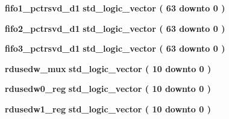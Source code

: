 \begin{DoxyCompactItemize}
\item 
{\bf fifo1\+\_\+pctrsvd\+\_\+d1} {\bfseries \textcolor{comment}{std\+\_\+logic\+\_\+vector}\textcolor{vhdlchar}{ }\textcolor{vhdlchar}{(}\textcolor{vhdlchar}{ }\textcolor{vhdlchar}{ } \textcolor{vhdldigit}{63} \textcolor{vhdlchar}{ }\textcolor{keywordflow}{downto}\textcolor{vhdlchar}{ }\textcolor{vhdlchar}{ } \textcolor{vhdldigit}{0} \textcolor{vhdlchar}{ }\textcolor{vhdlchar}{)}\textcolor{vhdlchar}{ }} 
\item 
{\bf fifo2\+\_\+pctrsvd\+\_\+d1} {\bfseries \textcolor{comment}{std\+\_\+logic\+\_\+vector}\textcolor{vhdlchar}{ }\textcolor{vhdlchar}{(}\textcolor{vhdlchar}{ }\textcolor{vhdlchar}{ } \textcolor{vhdldigit}{63} \textcolor{vhdlchar}{ }\textcolor{keywordflow}{downto}\textcolor{vhdlchar}{ }\textcolor{vhdlchar}{ } \textcolor{vhdldigit}{0} \textcolor{vhdlchar}{ }\textcolor{vhdlchar}{)}\textcolor{vhdlchar}{ }} 
\item 
{\bf fifo3\+\_\+pctrsvd\+\_\+d1} {\bfseries \textcolor{comment}{std\+\_\+logic\+\_\+vector}\textcolor{vhdlchar}{ }\textcolor{vhdlchar}{(}\textcolor{vhdlchar}{ }\textcolor{vhdlchar}{ } \textcolor{vhdldigit}{63} \textcolor{vhdlchar}{ }\textcolor{keywordflow}{downto}\textcolor{vhdlchar}{ }\textcolor{vhdlchar}{ } \textcolor{vhdldigit}{0} \textcolor{vhdlchar}{ }\textcolor{vhdlchar}{)}\textcolor{vhdlchar}{ }} 
\item 
{\bf rdusedw\+\_\+mux} {\bfseries \textcolor{comment}{std\+\_\+logic\+\_\+vector}\textcolor{vhdlchar}{ }\textcolor{vhdlchar}{(}\textcolor{vhdlchar}{ }\textcolor{vhdlchar}{ } \textcolor{vhdldigit}{10} \textcolor{vhdlchar}{ }\textcolor{keywordflow}{downto}\textcolor{vhdlchar}{ }\textcolor{vhdlchar}{ } \textcolor{vhdldigit}{0} \textcolor{vhdlchar}{ }\textcolor{vhdlchar}{)}\textcolor{vhdlchar}{ }} 
\item 
{\bf rdusedw0\+\_\+reg} {\bfseries \textcolor{comment}{std\+\_\+logic\+\_\+vector}\textcolor{vhdlchar}{ }\textcolor{vhdlchar}{(}\textcolor{vhdlchar}{ }\textcolor{vhdlchar}{ } \textcolor{vhdldigit}{10} \textcolor{vhdlchar}{ }\textcolor{keywordflow}{downto}\textcolor{vhdlchar}{ }\textcolor{vhdlchar}{ } \textcolor{vhdldigit}{0} \textcolor{vhdlchar}{ }\textcolor{vhdlchar}{)}\textcolor{vhdlchar}{ }} 
\item 
{\bf rdusedw1\+\_\+reg} {\bfseries \textcolor{comment}{std\+\_\+logic\+\_\+vector}\textcolor{vhdlchar}{ }\textcolor{vhdlchar}{(}\textcolor{vhdlchar}{ }\textcolor{vhdlchar}{ } \textcolor{vhdldigit}{10} \textcolor{vhdlchar}{ }\textcolor{keywordflow}{downto}\textcolor{vhdlchar}{ }\textcolor{vhdlchar}{ } \textcolor{vhdldigit}{0} \textcolor{vhdlchar}{ }\textcolor{vhdlchar}{)}\textcolor{vhdlchar}{ }} 

\end{DoxyCompactItemize}
